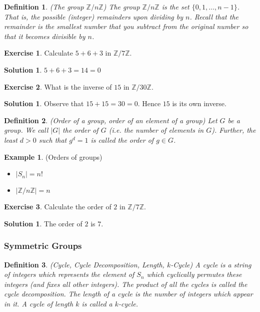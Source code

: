 \documentclass[12pt]{article}
\newtheorem{definition}{Definition}
\theoremstyle{definition}
\newtheorem{example}{Example}
\newtheorem{exercise}{Exercise}
\theoremstyle{definition}
\newtheorem{solution}[theorem]{Solution}
\begin{document}
\begin{definition}(The group $\mathbb{Z} / n \mathbb{Z}$)
The group $\mathbb{Z} / n \mathbb{Z}$ is the set $\{0,1,\ldots,n-1\}$. That is, the possible (integer) remainders upon dividing by $n$. Recall that the remainder is the smallest number that you subtract from the original number so that it becomes divisible by $n$. 
\end{definition}
\begin{exercise}
Calculate $5 + 6 + 3$ in $\mathbb{Z} / 7 \mathbb{Z}$.
\end{exercise}
\begin{solution}
$5 + 6+ 3 = 14 = 0$
\end{solution}
\begin{exercise}
What is the inverse of $15$ in $\mathbb{Z} / 30 \mathbb{Z}$.
\end{exercise}
\begin{solution}
Observe that $15 + 15 = 30 = 0$. Hence $15$ is its own inverse.
\end{solution}

\begin{definition}(Order of a group, order of an element of a group)
Let $G$ be a group. We call $|G|$ the order of $G$ (i.e. the number of elements in $G$). Further, the least $d >0$ such that $g^d = 1$ is called the order of $g \in G$.
\end{definition}
\begin{example}(Orders of groups)
\begin{itemize}
\item $|S_n| = n!$
\item $|\mathbb{Z} / n \mathbb{Z}| = n$
\end{itemize}
\end{example}

\begin{exercise}
Calculate the order of $2$ in $\mathbb{Z} / 7 \mathbb{Z}$.
\end{exercise}
\begin{solution}
The order of $2$ is $7$.
\end{solution}

\subsubsection{Symmetric Groups}
\begin{definition}(Cycle, Cycle Decomposition, Length, $k$-Cycle)
A cycle is a string of integers which represents the element of $S_n$ which cyclically permutes these integers (and fixes all other integers). The product of all the cycles is called the cycle decomposition. The length of a cycle is the number of integers which appear in it. A cycle of length $k$ is called a $k$-cycle. 
\end{definition}
\end{document}
